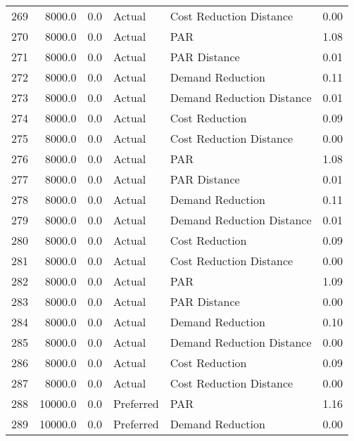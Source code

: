 \begin{longtable}{lrrllr}
269  &       8000.0 &     0.0 &         Actual &    Cost Reduction Distance &   0.00 \\
270  &       8000.0 &     0.0 &         Actual &                        PAR &   1.08 \\
271  &       8000.0 &     0.0 &         Actual &               PAR Distance &   0.01 \\
272  &       8000.0 &     0.0 &         Actual &           Demand Reduction &   0.11 \\
273  &       8000.0 &     0.0 &         Actual &  Demand Reduction Distance &   0.01 \\
274  &       8000.0 &     0.0 &         Actual &             Cost Reduction &   0.09 \\
275  &       8000.0 &     0.0 &         Actual &    Cost Reduction Distance &   0.00 \\
276  &       8000.0 &     0.0 &         Actual &                        PAR &   1.08 \\
277  &       8000.0 &     0.0 &         Actual &               PAR Distance &   0.01 \\
278  &       8000.0 &     0.0 &         Actual &           Demand Reduction &   0.11 \\
279  &       8000.0 &     0.0 &         Actual &  Demand Reduction Distance &   0.01 \\
280  &       8000.0 &     0.0 &         Actual &             Cost Reduction &   0.09 \\
281  &       8000.0 &     0.0 &         Actual &    Cost Reduction Distance &   0.00 \\
282  &       8000.0 &     0.0 &         Actual &                        PAR &   1.09 \\
283  &       8000.0 &     0.0 &         Actual &               PAR Distance &   0.00 \\
284  &       8000.0 &     0.0 &         Actual &           Demand Reduction &   0.10 \\
285  &       8000.0 &     0.0 &         Actual &  Demand Reduction Distance &   0.00 \\
286  &       8000.0 &     0.0 &         Actual &             Cost Reduction &   0.09 \\
287  &       8000.0 &     0.0 &         Actual &    Cost Reduction Distance &   0.00 \\
288  &      10000.0 &     0.0 &      Preferred &                        PAR &   1.16 \\
289  &      10000.0 &     0.0 &      Preferred &           Demand Reduction &   0.00 \\

\end{longtable}
